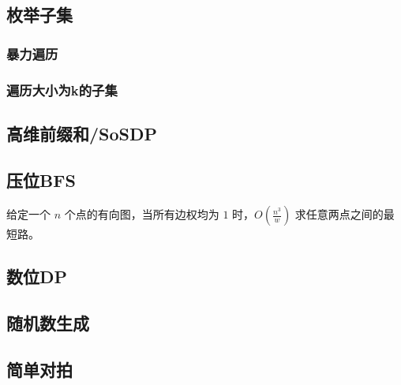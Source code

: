 \documentclass{article}
\begin{document}
\subsection{枚举子集}
\subsubsection{暴力遍历}

\subsubsection{遍历大小为k的子集}

\subsection{高维前缀和/SoSDP}

\subsection{压位BFS}
给定一个 $n$ 个点的有向图，当所有边权均为 $1$ 时，$O(\frac{n^3}{w})$ 求任意两点之间的最短路。

\subsection{数位DP}

\subsection{随机数生成}

\subsection{简单对拍}

\end{document}
